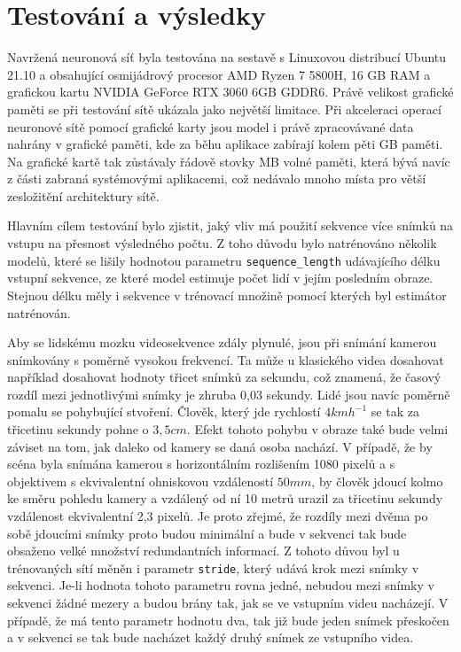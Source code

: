\chapter{Testování a výsledky}
\label{sec:Testing}

Navržená neuronová síť byla testována na sestavě s Linuxovou distribucí Ubuntu 21.10 a obsahující osmijádrový procesor AMD Ryzen 7 5800H, 16 GB RAM a grafickou kartu NVIDIA GeForce RTX 3060 6GB GDDR6.
Právě velikost grafické paměti se při testování sítě ukázala jako největší limitace.
Při akceleraci operací neuronové sítě pomocí grafické karty jsou model i právě zpracovávané data nahrány v grafické paměti, kde za běhu aplikace zabírají kolem pěti GB paměti. 
Na grafické kartě tak zůstávaly řádově stovky MB volné paměti, která bývá navíc z části zabraná systémovými aplikacemi, což nedávalo mnoho místa pro větší zesložitění architektury sítě.

Hlavním cílem testování bylo zjistit, jaký vliv má použití sekvence více snímků na vstupu na přesnost výsledného počtu.
Z toho důvodu bylo natrénováno několik modelů, které se lišily hodnotou parametru \texttt{sequence\_length} udávajícího délku vstupní sekvence, ze které model estimuje počet lidí v jejím posledním obraze.
Stejnou délku měly i sekvence v trénovací množině pomocí kterých byl estimátor natrénován.

Aby se lidskému mozku videosekvence zdály plynulé, jsou při snímání kamerou snímkovány s poměrně vysokou frekvencí. 
Ta může u klasického videa dosahovat například dosahovat hodnoty třicet snímků za sekundu, což znamená, že časový rozdíl mezi jednotlivými snímky je zhruba 0,03 sekundy.
Lidé jsou navíc poměrně pomalu se pohybující stvoření.
Člověk, který jde rychlostí \(4 kmh^{-1}\) se tak za třicetinu sekundy pohne o \(3,5 cm\).
Efekt tohoto pohybu v obraze také bude velmi záviset na tom, jak daleko od kamery se daná osoba nachází. 
V případě, že by scéna byla snímána kamerou s horizontálním rozlišením 1080 pixelů a s objektivem s ekvivalentní ohniskovou vzdáleností \(50 mm\), by člověk jdoucí kolmo ke směru pohledu kamery a vzdálený od ní 10 metrů urazil za třicetinu sekundy vzdálenost ekvivalentní 2,3 pixelů.
Je proto zřejmé, že rozdíly mezi dvěma po sobě jdoucími snímky proto budou minimální a bude v sekvenci tak bude obsaženo velké množství redundantních informací.
Z tohoto důvou byl u trénovaných sítí měněn i parametr \texttt{stride}, který udává krok mezi snímky v sekvenci.
Je-li hodnota tohoto parametru rovna jedné, nebudou mezi snímky v sekvenci žádné mezery a budou brány tak, jak se ve vstupním videu nacházejí.
V případě, že má tento parametr hodnotu dva, tak již bude jeden snímek přeskočen a v sekvenci se tak bude nacházet každý druhý snímek ze vstupního videa.






\endinput